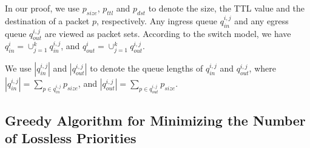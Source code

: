 In our proof, we use $p_{size}$, $p_{ttl}$ and $p_{dst}$ to denote the size, the TTL value and the destination of a packet $p$, respectively. Any ingress queue $q_{in}^{i,j}$ and any egress queue $q_{out}^{i,j}$ are viewed as packet sets. According to the switch model, we have $q_{in}^{i}=\cup_{j=1}^{k}q_{in}^{i,j}$, and $q_{out}^{i}=\cup_{j=1}^{k}q_{out}^{i,j}$.

We use $|q_{in}^{i,j}|$ and $|q_{out}^{i,j}|$ to denote the queue lengths of $q_{in}^{i,j}$ and $q_{out}^{i,j}$, where $|q_{in}^{i,j}|=\sum_{p\in q_{in}^{i,j}}p_{size}$, and $|q_{out}^{i,j}|=\sum_{p\in q_{out}^{i,j}}p_{size}$.
\fi




\subsection{Greedy Algorithm for Minimizing the Number of Lossless Priorities}

